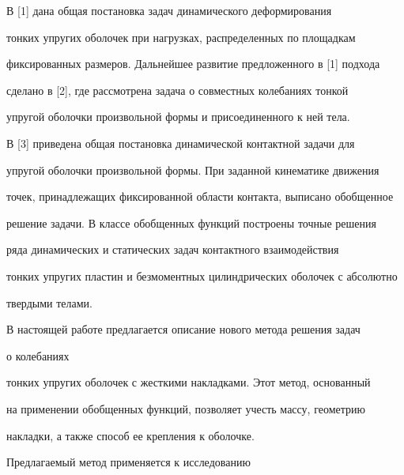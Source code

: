 \pagestyle{plain} %













\maketitle


\label{begin}





В [1] дана общая постановка задач динамического деформирования


тонких упругих оболочек при нагрузках, распределенных по площадкам


фиксированных размеров. Дальнейшее развитие предложенного в [1] подхода


сделано в [2], где рассмотрена задача о совместных колебаниях тонкой


упругой оболочки произвольной формы и присоединенного к ней тела.


В [3] приведена общая постановка динамической контактной задачи для


упругой оболочки произвольной формы. При заданной кинематике движения


точек, принадлежащих фиксированной области контакта, выписано обобщенное


решение задачи. В классе обобщенных функций построены точные решения


ряда динамических и статических задач контактного взаимодействия


тонких упругих пластин и безмоментных цилиндрических оболочек с абсолютно


твердыми телами.





В настоящей работе предлагается описание нового метода решения задач


о колебаниях


тонких упругих оболочек с жесткими накладками. Этот метод, основанный


на применении обобщенных функций, позволяет учесть массу, геометрию


накладки, а также способ ее крепления к оболочке.


Предлагаемый метод применяется к исследованию


